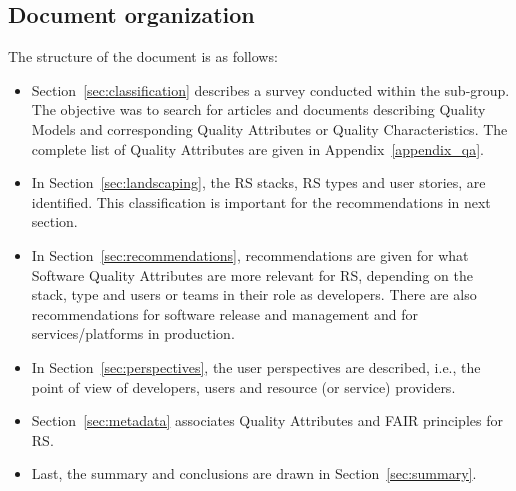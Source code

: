 \subsection{Document organization}

The structure of the document is as follows:

\begin{itemize}
    \item Section~\ref{sec:classification} describes a survey conducted within the sub-group. The objective was to search for articles and documents describing Quality Models and corresponding Quality Attributes or Quality Characteristics. The complete list of Quality Attributes are given in Appendix~\ref{appendix_qa}.
    
    \item In Section~\ref{sec:landscaping}, the RS stacks, RS types and user stories, are identified. This classification is important for the recommendations in next section.

    \item In Section~\ref{sec:recommendations}, recommendations are given for what Software Quality Attributes are more relevant for RS, depending on the stack, type and users or teams in their role as developers. There are also recommendations for software release and management and for services/platforms in production.
    
    \item In Section~\ref{sec:perspectives}, the user perspectives are described, i.e., the point of view of developers, users and resource (or service) providers.
    
    \item Section~\ref{sec:metadata} associates Quality Attributes and FAIR principles for RS.
    
    \item Last, the summary and conclusions are drawn in Section~\ref{sec:summary}.
\end{itemize}